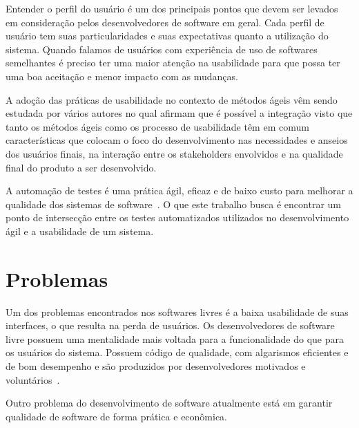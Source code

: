 Entender o perfil do usuário é um dos principais pontos que devem ser levados em consideração pelos desenvolvedores de software em geral. Cada perfil de usuário tem suas particularidades e suas expectativas quanto a utilização do sistema. Quando falamos de usuários com experiência de uso de softwares semelhantes é preciso ter uma maior atenção na usabilidade para que possa ter uma boa aceitação e menor impacto com as mudanças.

A adoção das práticas de usabilidade no contexto de métodos ágeis vêm sendo estudada por vários autores no qual afirmam que é possível a integração visto que tanto os métodos ágeis como os processo de usabilidade têm em comum características que colocam o foco do desenvolvimento nas necessidades e anseios dos usuários finais, na interação entre os stakeholders envolvidos e na qualidade final do produto a ser desenvolvido.


A automação de testes é uma prática ágil, eficaz e de baixo custo para melhorar a qualidade dos sistemas de software~\cite{cotter1995}. O que este trabalho busca é encontrar um ponto de intersecção entre os testes automatizados utilizados no desenvolvimento ágil e a usabilidade de um sistema.

 

\section{Problemas}

Um dos problemas encontrados nos softwares livres é a baixa usabilidade de suas interfaces, o que resulta na perda de usuários. 
%
Os desenvolvedores de software livre possuem uma mentalidade mais voltada para a funcionalidade do que para os usuários do sistema. Possuem código de qualidade, com algarismos eficientes e de bom desempenho e são produzidos por desenvolvedores motivados e voluntários~\cite{santos2012}. 

Outro problema do desenvolvimento de software atualmente está em garantir qualidade de software de forma prática e econômica.


